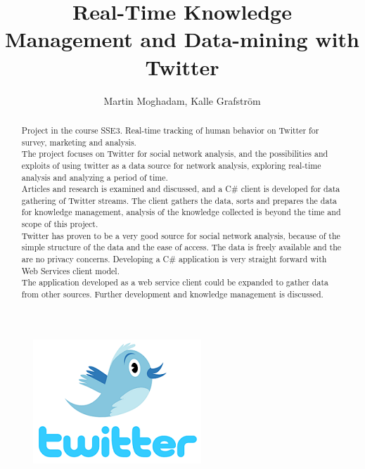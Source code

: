 \documentclass[]{article}  %
\begin{document}
\title{Real-Time Knowledge Management and Data-mining with Twitter}   %
\author{Martin Moghadam, Kalle Grafstr\"{o}m}         %
\maketitle

\begin{figure}[h]
\centering
\includegraphics[scale=1]{Twitter_Icon.png}
\end{figure}

\begin{abstract}
Project in the course SSE3. Real-time tracking of human behavior on Twitter for survey, marketing and analysis. \\  The project focuses on Twitter for social network analysis, and the possibilities and exploits of using twitter as a data source for network analysis, exploring real-time analysis and analyzing a period of time. \\ Articles and research is examined and discussed, and a C\# client is developed for data gathering of Twitter streams. The client gathers the data, sorts and prepares the data for knowledge management, analysis of the knowledge collected is beyond the time and scope of this project. \\ Twitter has proven to be a very good source for social network analysis, because of the simple structure of the data and the ease of access. The data is freely available and the are no privacy concerns. Developing a C\# application is very straight forward with Web Services client model. \\ The application developed as a web service client could be expanded to gather data from other sources. Further development and knowledge management is discussed.

\end{abstract}





\end{document}
